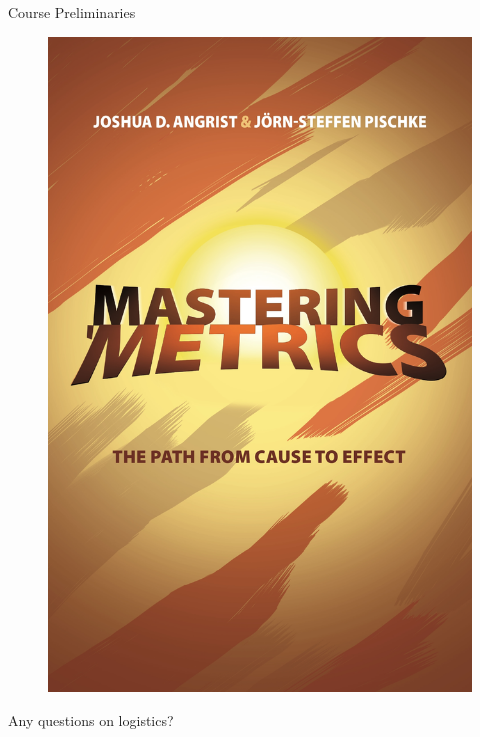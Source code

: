 \documentclass[11pt,english]{beamer}
\begin{document}
\begin{frame}{Course Preliminaries}
\begin{figure}
\begin{minipage}{0.45\textwidth}
			\includegraphics[width=\textwidth]{book_masteringmetrics.jpg}
		\end{minipage}
	\end{figure}


	\vspace{0.5cm}
	Any questions on logistics? 

\end{frame}
\end{document}
